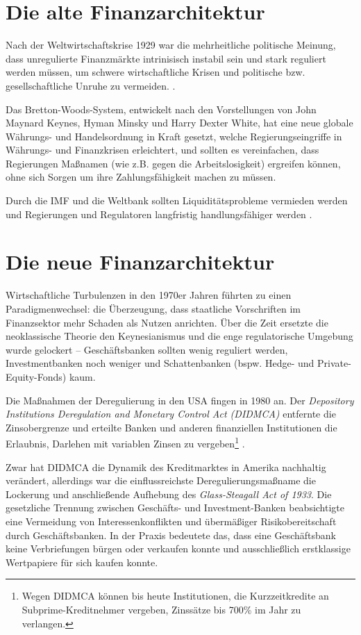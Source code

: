 \documentclass[a4paper,11pt]{report}
\begin{document}
\section{Die alte Finanzarchitektur}
Nach der Weltwirtschaftskrise 1929 war die mehrheitliche politische
Meinung, dass unregulierte
Finanzm\"arkte intrinisisch instabil sein und stark reguliert
werden m\"ussen, um schwere wirtschaftliche Krisen und politische bzw. gesellschaftliche
Unruhe zu vermeiden. \parencite[S. 563f.]{crottycam}.

Das Bretton-Woods-System,
entwickelt nach den Vorstellungen von John Maynard Keynes,
Hyman Minsky und Harry Dexter White, hat eine neue globale W\"ahrungs-
und Handelsordnung in Kraft gesetzt, welche Regierungseingriffe
in W\"ahrungs- und Finanzkrisen erleichtert, und sollten es
vereinfachen, dass Regierungen Maßnamen (wie z.B. gegen die Arbeitslosigkeit) ergreifen
k\"onnen, ohne sich Sorgen um ihre Zahlungsf\"ahigkeit machen zu m\"ussen.

Durch die IMF und die Weltbank sollten Liquidit\"atsprobleme
vermieden werden und Regierungen und Regulatoren langfristig handlungsf\"ahiger werden
\parencite[S. 31f.]{bordo}.

\section{Die neue Finanzarchitektur}
Wirtschaftliche Turbulenzen in den 1970er Jahren f\"uhrten
zu einen Paradigmenwechsel: die \"Uberzeugung, dass staatliche
Vorschriften im Finanzsektor mehr Schaden als Nutzen anrichten.
\"Uber die Zeit ersetzte die neoklassische Theorie den 
Keynesianismus und die enge regulatorische Umgebung wurde gelockert
-- Geschäftsbanken sollten wenig reguliert werden, Investmentbanken
noch weniger und Schattenbanken (bspw. Hedge- und Private-Equity-Fonds) kaum.

Die Maßnahmen der Deregulierung in den USA fingen in 1980 an. Der
\textit{Depository Institutions Deregulation and Monetary Control Act (DIDMCA)}
entfernte die Zinsobergrenze und erteilte Banken und anderen
finanziellen Institutionen die Erlaubnis, Darlehen mit variablen
 Zinsen zu vergeben\footnote{Wegen DIDMCA k\"onnen bis heute
 Institutionen, die Kurzzeitkredite an Subprime-Kreditnehmer
 vergeben, Zinss\"atze bis 700\% im Jahr zu verlangen.}
\parencite[6--8]{sherman2009short}.

Zwar hat DIDMCA die Dynamik des Kreditmarktes in Amerika nachhaltig
ver\"andert, allerdings war die einflussreichste Deregulierungsmaßname
die Lockerung und anschließende Aufhebung des
\textit{Glass-Steagall Act of 1933}.
Die gesetzliche Trennung zwischen Geschäfts- und Investment-Banken
beabsichtigte eine Vermeidung von Interessenkonflikten und 
\"uberm\"aßiger Risikobereitschaft durch Geschäftsbanken.
In der Praxis bedeutete das, dass eine Gesch\"aftsbank keine 
Verbriefungen b\"urgen oder verkaufen konnte und ausschließlich
erstklassige Wertpapiere f\"ur sich kaufen konnte.
\end{document}
